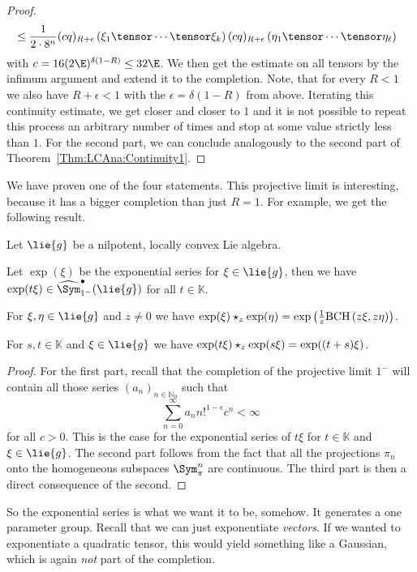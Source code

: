 \begin{proof}
\begin{align*}
        & \leq
        \frac{1}{2 \cdot 8^n}
        (c q)_{R + \epsilon} 
        \left( \xi_1 \tensor \cdots \tensor \xi_k \right)
        (c q)_{R + \epsilon} 
        \left( \eta_1 \tensor \cdots \tensor \eta_\ell \right)
    \end{align*}
    with $c = 16 (2 \E)^{\delta (1 - R)} \leq 32 \E$.
    We then get the estimate on all tensors by the infimum argument and extend 
    it to the completion. Note, that for every $R < 1$ we also have 
    $R + \epsilon < 1$ with the $\epsilon = \delta(1-R)$ from above. Iterating 
    this continuity estimate, we get closer and closer to $1$ and it is not 
    possible to repeat this process an arbitrary number of times and stop at 
    some value strictly less than $1$. For the second part, we can conclude 
    analogously to the second part of Theorem~\ref{Thm:LCAna:Continuity1}.
\end{proof}
We have proven one of the four statements. This projective limit is interesting, 
because it has a bigger completion than just $R = 1$. For example, we get the 
following result.
\begin{corollary}
    \label{corollary:NilpotentCase}%
    Let $\lie{g}$ be a nilpotent, locally convex Lie algebra.
    \begin{corollarylist}
    \item \label{item:NilpotentHasExp} 
    	Let $\exp(\xi)$ be the
        exponential series for $\xi \in \lie{g}$, then we have $\exp(t
        \xi) \in \widehat{\Sym}_{1^-}^\bullet(\lie{g})$ for all $t
        \in \mathbb{K}$.
    \item \label{item:NilpotentExpGivesBCH} 
    	For $\xi, \eta \in
        \lie{g}$ and $z \neq 0$ we have $\exp(\xi) \star_z
        \exp(\eta) = \exp \left(\frac 1 z \mathrm{BCH}\left(z \xi, z \eta\right)
        \right)$.
    \item \label{item:NipotentOneParameterGroups}
    	For $s,t \in
        \mathbb{K}$ and $\xi \in \lie{g}$ we have $\exp(t \xi)
        \star_z \exp(s \xi) = \exp ((t + s) \xi)$.
    \end{corollarylist}
\end{corollary}
\begin{proof}
    For the first part, recall that the completion of the projective
    limit $1^-$ will contain all those series $(a_n)_{n \in
      \mathbb{N}_0}$ such that
    \begin{equation*}
        \sum\limits_{n=0}^{\infty}
        a_n n!^{1 - \epsilon} c^n
        <
        \infty
    \end{equation*}
    for all $c > 0$.  This is the case for the exponential series of
    $t \xi$ for $t \in \mathbb{K}$ and $\xi \in \lie{g}$. The second
    part follows from the fact that all the projections $\pi_n$ onto
    the homogeneous subspaces $\Sym_{\pi}^n$ are continuous. The third
    part is then a direct consequence of the second.
\end{proof}
So the exponential series is what we want it to be, somehow. It generates a one 
parameter group. Recall that we can just exponentiate \emph{vectors}. If we wanted 
to exponentiate a quadratic tensor, this would yield something like a Gaussian, 
which is again \emph{not} part of the completion.



